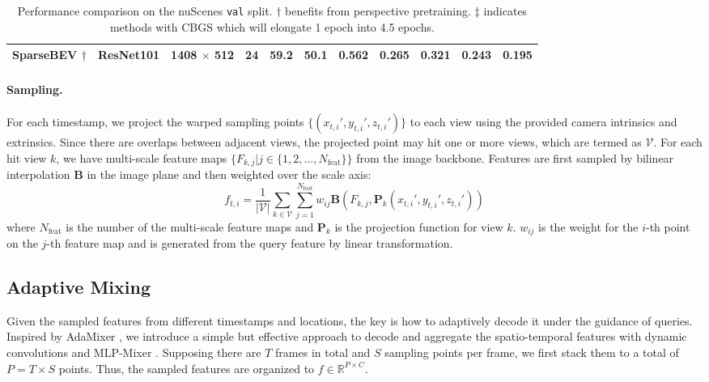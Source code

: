 \documentclass[10pt,twocolumn,letterpaper]{article}
\begin{document}
\begin{table*}[t]
\begin{tabular}{l|ccc|cc|ccccc}
      \rowcolor{Gray}
      \textbf{SparseBEV} $\dagger$         & ResNet101 & 1408 $\times$ 512 & 24 & \textbf{59.2} & \textbf{50.1} & 0.562 & 0.265 & 0.321 & 0.243 & 0.195 \\
      \bottomrule
   \end{tabular}
   \vspace{-5pt}
   \caption{Performance comparison on the nuScenes \texttt{val} split. $\dagger$ benefits from perspective pretraining. $\ddagger$ indicates methods with CBGS \cite{cbgs} which will elongate 1 epoch into 4.5 epochs.}
   \label{table:nuscenes_val}
\end{table*}

\vspace{-5pt}
\paragraph{Sampling.} For each timestamp, we project the warped sampling points $\{(x_{t, i}', y_{t, i}', z_{t, i}')\}$ to each view using the provided camera intrinsics and extrinsics. Since there are overlaps between adjacent views, the projected point may hit one or more views, which are termed as $\mathcal{V}$. For each hit view $k$, we have multi-scale feature maps $\{F_{k, j} | j \in \{1, 2, ... ,N_{\text{feat}}\} \}$ from the image backbone. Features are first sampled by bilinear interpolation $\mathbf{B}$ in the image plane and then weighted over the scale axis:
\begin{equation}
  f_{t, i} = \frac{1}{|\mathcal{V}|} \sum_{k \in \mathcal{V}} \sum_{j=1}^{N_{\text{feat}}} w_{ij} \mathbf{B} (F_{k, j}, \mathbf{P}_k(x_{t, i}', y_{t, i}', z_{t, i}'))
\end{equation}
where $N_{\text{feat}}$ is the number of the multi-scale feature maps and $\mathbf{P}_k$ is the projection function for view $k$. $w_{ij}$ is the weight for the $i$-th point on the $j$-th feature map and is generated from the query feature by linear transformation.

\subsection{Adaptive Mixing}

Given the sampled features from different timestamps and locations, the key is how to adaptively decode it under the guidance of queries. Inspired by AdaMixer \cite{adamixer}, we introduce a simple but effective approach to decode and aggregate the spatio-temporal features with dynamic convolutions \cite{dynamic_conv} and MLP-Mixer \cite{mlpmixer}.
Supposing there are $T$ frames in total and $S$ sampling points per frame, we first stack them to a total of $P=T \times S$ points. Thus, the sampled features are organized to $f \in \mathbb{R}^{P \times C}$.
\end{document}
